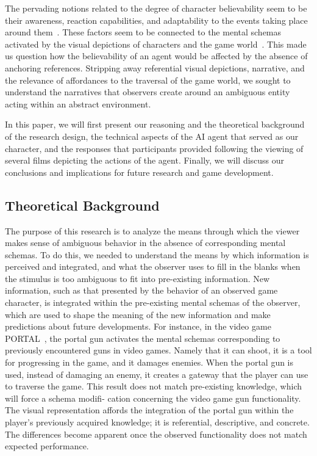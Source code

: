 The pervading notions related to the degree of character believability seem to be their awareness, reaction capabilities, and adaptability to the events taking place around them~. These factors seem to be connected to the mental schemas activated by the visual depictions of characters and the game world~. This made us question how the believability of an agent would be affected by the absence  of anchoring references. Stripping away referential visual depictions, narrative, and the relevance of affordances to the traversal of the game world, we sought to understand the narratives that observers create around an ambiguous entity acting within an abstract environment.

In this paper, we will first present our reasoning and the theoretical background of the research design, the technical aspects of the AI agent that served as our character, and the responses that participants provided following the viewing of several films depicting the actions of the agent. Finally, we will discuss our conclusions and implications for future research and game development.


\subsection{Theoretical Background}

The purpose of this research is to analyze the means through which the viewer makes sense of ambiguous behavior in the absence of corresponding mental schemas. To do this, we needed to understand the means by which information is perceived and integrated, and what the observer uses to fill in the blanks when the stimulus is too ambiguous to fit into pre-existing information. New information, such as that presented by the behavior of an observed game character, is integrated within the pre-existing mental schemas of the observer, which are used to shape the meaning of the new information and make predictions about future developments. For instance, in the video game PORTAL~, the portal gun activates the mental schemas corresponding to previously encountered guns in video games. Namely that it can shoot, it is a tool for progressing in the game, and it damages enemies. When the portal gun is used, instead of damaging an enemy, it creates a gateway that the player can use to traverse the game. This result does not match pre-existing knowledge, which will force a schema modifi- cation concerning the video game gun functionality. The visual representation affords the integration of the portal gun within the player’s previously acquired knowledge; it is referential, descriptive, and concrete. The differences become apparent once the observed functionality does not match expected performance.
 
